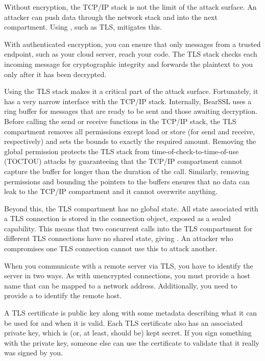 Without encryption, the TCP/IP stack is not the limit of the attack surface.
An attacker can push data through the network stack and into the next compartment.
Using , such as TLS, mitigates this.

With authenticated encryption, you can ensure that only messages from a trusted endpoint, such as your cloud server, reach your code.
The TLS stack checks each incoming message for cryptographic integrity and forwards the plaintext to you only after it has been decrypted.

Using the TLS stack makes it a critical part of the attack surface.
Fortunately, it has a very narrow interface with the TCP/IP stack.
Internally, BearSSL uses a ring buffer for messages that are ready to be sent and those awaiting decryption.
Before calling the send or receive functions in the TCP/IP stack, the TLS compartment removes all permissions except load or store (for send and receive, respectively) and sets the bounds to exactly the required amount.
Removing the global permission protects the TLS stack from time-of-check-to-time-of-use (TOCTOU) attacks by guaranteeing that the TCP/IP compartment cannot capture the buffer for longer than the duration of the call.
Similarly, removing permissions and bounding the pointers to the buffers ensures that no data can leak to the TCP/IP compartment and it cannot overwrite anything.

Beyond this, the TLS compartment has no global state.
All state associated with a TLS connection is stored in the connection object, exposed as a sealed capability.
This means that two concurrent calls into the TLS compartment for different TLS connections have no shared state, giving .
An attacker who compromises one TLS connection cannot use this to attack another.

When you communicate with a remote server via TLS, you have to identify the server in two ways.
As with unencrypted connections, you must provide a host name that can be mapped to a network address.
Additionally, you need to provide a  to identify the remote host.

A TLS certificate is public key along with some metadata describing what it can be used for and when it is valid.
Each TLS certificate also has an associated private key, which is (or, at least, should be) kept secret.
If you sign something with the private key, someone else can use the certificate to validate that it really was signed by you.

